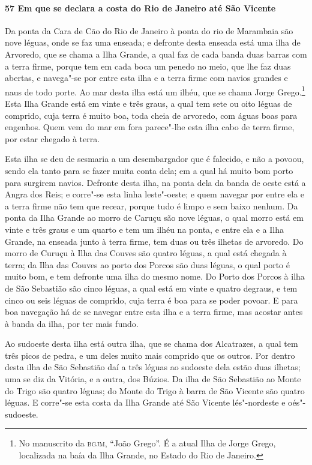 \begin{linenumbers}
\paragraph{57 Em que se declara a costa do Rio de Janeiro até São Vicente} \quad
Da ponta da Cara de Cão do Rio de Janeiro à ponta do rio de Marambaia são nove léguas,
onde se faz uma enseada; e defronte desta enseada está uma ilha de Arvoredo, que se chama
a Ilha Grande, a qual faz de cada banda duas barras com a terra firme, porque tem em cada
boca um penedo no meio, que lhe faz duas abertas, e navega"-se por entre esta ilha e a
terra firme com navios grandes e naus de todo porte. Ao mar desta ilha está um ilhéu, que
se chama Jorge Grego.\footnote{ No manuscrito da \textsc{bgjm}, ``João Grego''. É a atual
Ilha de Jorge Grego, localizada na baía da Ilha Grande, no Estado do Rio de Janeiro.}
Esta Ilha Grande está em vinte e três graus, a qual tem sete ou oito léguas de comprido,
cuja terra é muito boa, toda cheia de arvoredo, com águas boas para engenhos. Quem vem do
mar em fora parece"-lhe esta ilha cabo de terra firme, por estar chegado à terra.

Esta ilha se deu de sesmaria a um desembargador que é falecido, e não a povoou, sendo ela
tanto para se fazer muita conta dela; em a qual há muito bom porto para surgirem navios.
Defronte desta ilha, na ponta dela da banda de oeste está a Angra dos Reis; e corre"-se
esta linha leste"-oeste; e quem navegar por entre ela e a terra firme não tem que recear,
porque tudo é limpo e sem baixo nenhum. Da ponta da Ilha Grande ao morro de Caruçu são
nove léguas, o qual morro está em vinte e três graus e um quarto e tem um ilhéu na ponta,
e entre ela e a Ilha Grande, na enseada junto à terra firme, tem duas ou três ilhetas de
arvoredo. Do morro de Curuçu à Ilha das Couves são quatro léguas, a qual está chegada à
terra; da Ilha das Couves ao porto dos Porcos são duas léguas, o qual porto é muito bom, e
tem defronte uma ilha do mesmo nome. Do Porto dos Porcos à ilha de São Sebastião são cinco
léguas, a qual está em vinte e quatro degraus, e tem cinco ou seis léguas de comprido,
cuja terra é boa para se poder povoar. E para boa navegação há de se navegar entre esta
ilha e a terra firme, mas acostar antes à banda da ilha, por ter mais fundo.

Ao sudoeste desta ilha está outra ilha, que se chama dos Alcatrazes, a qual tem três picos
de pedra, e um deles muito mais comprido que os outros. Por dentro desta ilha de São
Sebastião daí a três léguas ao sudoeste dela estão duas ilhetas; uma se diz da Vitória, e
a outra, dos Búzios. Da ilha de São Sebastião ao Monte do Trigo são quatro léguas; do
Monte do Trigo à barra de São Vicente são quatro léguas. E corre"-se esta costa da Ilha
Grande até São Vicente lés"-nordeste e oés"-sudoeste.


\end{linenumbers}
